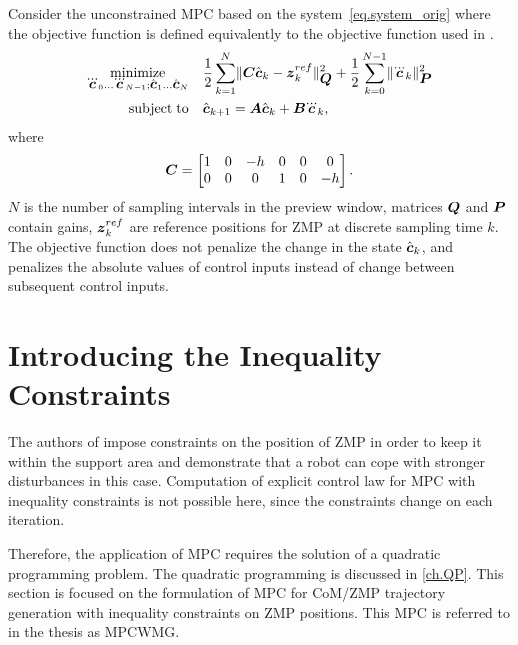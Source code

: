 Consider the unconstrained \ac{MPC} based on the system~\eqref{eq.system_orig}
where the objective function is defined equivalently to the objective function
used in \cite{WieberMPC}.
\begin{equation}\label{eq.opt_simple}
\begin{split}
\minimize{\dddot{\mbm{c}}_0 \dots \dddot{\mbm{c}}_{N-1}; \hat{\mbm{c}}_1 \dots \hat{\mbm{c}}_{N}}
            & \frac{1}{2} \sum_{k=1}^{N}   \norm{ \mbm{C} \hat{\mbm{c}}_{k} - \mbm{z}_k^{ref} }^2_{\mbm{Q}} 
            + \frac{1}{2} \sum_{k=0}^{N-1} \norm{ \dddot{\mbm{c}}_k }^2_{\mbm{P}}\\
\subjectto  & \hat{\mbm{c}}_{k+1} = \mbm{A}\hat{\mbm{c}}_{k}+\mbm{B}\dddot{\mbm{c}}_{k},\\
\end{split}
\end{equation}
where 
$$
\mbox{\boldmath $C$} = 
\begin{bmatrix}
    1 & 0 & -h & 0 & 0 & 0\\ 
    0 & 0 & 0  & 1 & 0 & -h\\
\end{bmatrix}.
$$
$N$ is the number of sampling intervals in the preview window, matrices $\mbox{\boldmath $Q$}$ 
and $\mbox{\boldmath $P$}$ contain gains, $\mbox{\boldmath $z$}_k^{ref}$ are reference positions for \ac{ZMP}
at discrete sampling time $k$. The objective function does not penalize the change 
in the state $\hat{\mbox{\boldmath $c$}}_{k}$, and penalizes the absolute values of control 
inputs instead of change between subsequent control inputs.


\section{Introducing the Inequality Constraints}\label{sec.ds_constraints}
The authors of \cite{WieberMPC} impose constraints on the position of \ac{ZMP}
in order to keep it within the support area and demonstrate that a robot can cope 
with stronger disturbances in this case. Computation of explicit control law for 
\ac{MPC} with inequality constraints \cite{BemporadConstrLQR} is not possible here, 
since the constraints change on each iteration.

Therefore, the application of MPC requires the solution of a quadratic programming 
problem. The quadratic programming is discussed in \cref{ch.QP}. This section is 
focused on the formulation of \ac{MPC} for \ac{CoM}/\ac{ZMP} trajectory generation 
with inequality constraints on \ac{ZMP} positions. This \ac{MPC} is referred to in 
the thesis as \ac{MPCWMG}.


